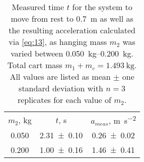 \begin{table}[hb]
\caption{\label{tab:newtable1} Measured time $t$ for the system to move from rest to \qty{0.7}{\meter} as well as the resulting acceleration calculated via \cref{eq:13}, as hanging mass $m_2$ was varied between \qtyrange{0.050}{0.200}{\kilo\gram}.  Total cart mass $m_1 + m_c =\qty{1.493}{\kilogram}$. All values are listed as mean $\pm$ one standard deviation with $n=3$ replicates for each value of $m_2$.}
\begin{center}
\begin{ruledtabular}
\begin{tabular}{ccc}
$m_2$, \unit{\kilo\gram} & $t$, \unit{\second} & $a_{meas}$, \unit{\meter\per\second\squared} \\ 
\num{0.050} & \num{2.31\pm0.10} & \num{0.26\pm0.02} \\ 
\num{0.200} & \num{1.00\pm0.16} & \num{1.46\pm0.41} \\ 
\end{tabular}
\end{ruledtabular}
\end{center}
\end{table}
